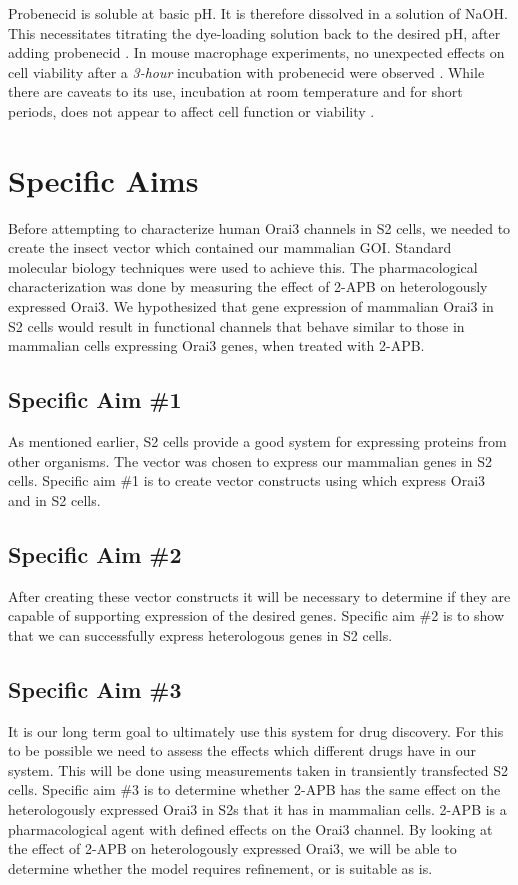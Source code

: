 Probenecid is soluble at basic pH. It is therefore dissolved in a solution of NaOH. This necessitates titrating the dye-loading solution back to the desired pH, after adding probenecid \citep{DiVirgilio1990}.  In mouse macrophage experiments, no unexpected effects on cell viability after a \emph{3-hour} incubation with probenecid were observed \citep{DiVirgilio1990}.  While there are caveats to its use, incubation at room temperature and for short periods, does not appear to affect cell function or viability \citep{Cordova2003a,DiVirgilio1990,Yeromin:2004p520}. 


\section{Specific Aims}
Before attempting to characterize human Orai3 \Ca{} channels in \droso{} S2 cells, we needed to create the insect vector which contained our mammalian GOI. Standard molecular biology techniques were used to achieve this. The pharmacological characterization was done by measuring the effect of 2-APB on heterologously expressed Orai3. We hypothesized that gene expression of mammalian Orai3 in \droso{} S2 cells would result in functional \Ca{} channels that behave similar to those in mammalian cells expressing Orai3 genes, when treated with 2-APB. 

\subsection{Specific Aim \#1}
As mentioned earlier, \droso{} S2 cells provide a good system for expressing proteins from other organisms. The \puchygmt{} vector was chosen to express our mammalian genes in S2 cells.  Specific aim \#1 is to create vector constructs using \puchygmt{} which express Orai3 and \stim{} in \droso{} S2 cells. 

\subsection{Specific Aim \#2}
After creating these vector constructs it will be necessary to determine if they are capable of supporting expression of the desired genes. Specific aim \#2 is to show that we can successfully express heterologous genes in \droso{} S2 cells.

\subsection{Specific Aim \#3}
It is our long term goal to ultimately use this system for drug discovery. For this to be possible we need to assess the effects which different drugs have in our system. This will be done using \Ca{} measurements taken in transiently transfected \droso{} S2 cells. Specific aim \#3 is to determine whether 2-APB has the same effect on the heterologously expressed Orai3 in S2s that it has in mammalian cells. 2-APB is a pharmacological agent with defined effects on the Orai3 \Ca{} channel. By looking at the effect of 2-APB on heterologously expressed Orai3, we will be able to determine whether the model requires refinement, or is suitable as is.

